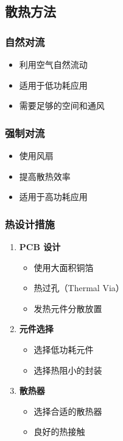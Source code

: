 \subsection{散热方法}

\subsubsection{自然对流}

\begin{itemize}
  \item 利用空气自然流动
  \item 适用于低功耗应用
  \item 需要足够的空间和通风
\end{itemize}

\subsubsection{强制对流}

\begin{itemize}
  \item 使用风扇
  \item 提高散热效率
  \item 适用于高功耗应用
\end{itemize}

\subsubsection{热设计措施}

\begin{enumerate}
  \item \textbf{PCB 设计}
    \begin{itemize}
      \item 使用大面积铜箔
      \item 热过孔（Thermal Via）
      \item 发热元件分散放置
    \end{itemize}

  \item \textbf{元件选择}
    \begin{itemize}
      \item 选择低功耗元件
      \item 选择热阻小的封装
    \end{itemize}

  \item \textbf{散热器}
    \begin{itemize}
      \item 选择合适的散热器
      \item 良好的热接触
    \end{itemize}
\end{enumerate}

